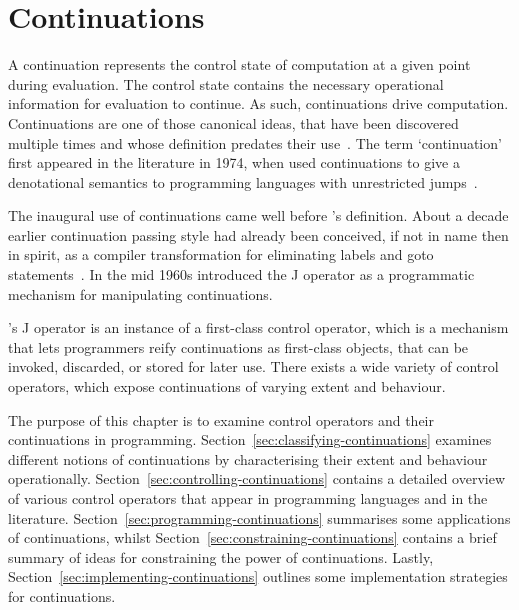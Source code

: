 \documentclass[12pt,phd,lfcs,twoside,openright,logo,leftchapter,normalheadings]{infthesis}
\theoremstyle{plain}
\theoremstyle{definition}
\begin{document}

\chapter{Continuations}
\label{ch:continuations}

A continuation represents the control state of computation at a given
point during evaluation. The control state contains the necessary
operational information for evaluation to continue. As such,
continuations drive computation. %
%
Continuations are one of those canonical ideas, that have been
discovered multiple times and whose definition predates their
use~\cite{Reynolds93}. The term `continuation' first appeared in the
literature in 1974, when \citet{StracheyW74} used continuations to
give a denotational semantics to programming languages with
unrestricted jumps~\cite{StracheyW00}.

The inaugural use of continuations came well before
\citeauthor{StracheyW00}'s definition. About a decade earlier
continuation passing style had already been conceived, if not in name
then in spirit, as a compiler transformation for eliminating labels
and goto statements~\cite{Reynolds93}. In the mid 1960s
\citet{Landin98} introduced the J operator as a programmatic mechanism
for manipulating continuations.

\citeauthor{Landin98}'s J operator is an instance of a first-class
control operator, which is a mechanism that lets programmers reify
continuations as first-class objects, that can be invoked, discarded,
or stored for later use. There exists a wide variety of control
operators, which expose continuations of varying extent and behaviour.

The purpose of this chapter is to examine control operators and their
continuations in
programming. Section~\ref{sec:classifying-continuations} examines
different notions of continuations by characterising their extent and
behaviour operationally. Section~\ref{sec:controlling-continuations}
contains a detailed overview of various control operators that appear
in programming languages and in the
literature. Section~\ref{sec:programming-continuations} summarises
some applications of continuations, whilst
Section~\ref{sec:constraining-continuations} contains a brief summary
of ideas for constraining the power of continuations. Lastly,
Section~\ref{sec:implementing-continuations} outlines some
implementation strategies for continuations.
\end{document}

